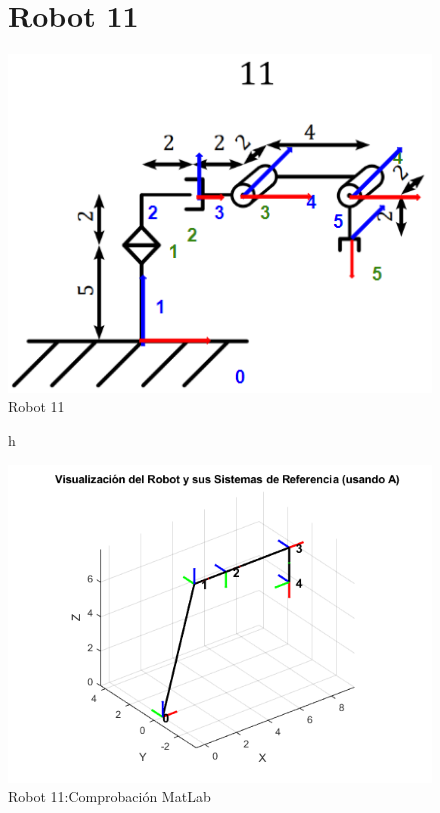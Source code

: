 \begin{figure}[h]
	\section{Robot 11}
	\centering
	{%
	\includegraphics[width=0.5\linewidth]{img/Diagrama11}
	\caption{Robot 11}
	\label{fig:diagrama11}
	}
\end{figure}
\begin{figure}{h}
	\centering
	{%
	\includegraphics[width=0.7\linewidth]{img/MatLab11}
	\caption{Robot 11:Comprobación MatLab}
	\label{fig:matlab11}
	}
\end{figure}
